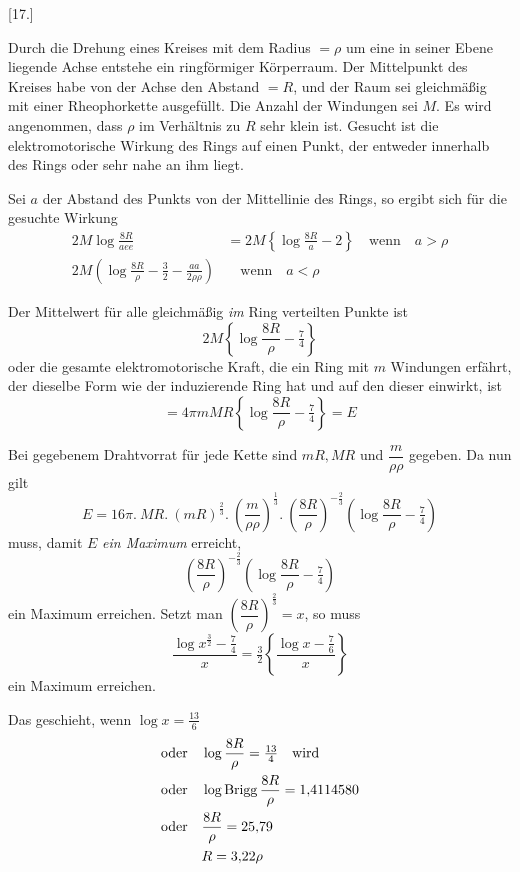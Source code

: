 \begin{center}[17.]\end{center}
Durch die Drehung eines Kreises mit dem Radius $=\rho$ um eine in seiner Ebene liegende Achse entstehe ein ringförmiger Körperraum. Der Mittelpunkt des Kreises habe von der Achse den Abstand $=R$, und der Raum sei gleichmäßig mit einer Rheophorkette ausgefüllt. Die Anzahl der Windungen sei $M$. Es wird angenommen, dass $\rho$ im Verhältnis zu $R$ sehr klein ist. Gesucht ist die elektromotorische Wirkung des Rings auf einen Punkt, der entweder innerhalb des Rings oder sehr nahe an ihm liegt.
\begin{center}\end{center}

Sei $a$ der Abstand des Punkts von der Mittellinie des Rings, so ergibt sich für die gesuchte Wirkung
\[
\begin{aligned}
2M\log\frac{8R}{aee}&=2M\left\{\log\frac{8R}{a}-2\right\}\quad\text{wenn}\quad a>\rho\\
2M\left(\log\frac{8R}{\rho}-\tfrac32-\frac{aa}{2\rho\rho}\right)&\quad\text{wenn}\quad a<\rho
\end{aligned}
\]

Der Mittelwert für alle gleichmäßig \textit{im} Ring verteilten Punkte ist
\[
2M\left\{\log\frac{8R}{\rho}-\tfrac74\right\}
\]
oder die gesamte elektromotorische Kraft, die ein Ring mit $m$ Windungen erfährt, der dieselbe Form wie der induzierende Ring hat und auf den dieser einwirkt, ist
\[
=4\pi mMR\left\{\log\frac{8R}{\rho}-\tfrac74\right\}=E
\]

Bei gegebenem Drahtvorrat für jede Kette sind $mR,MR$ und $\dfrac{m}{\rho\rho}$ gegeben. Da nun gilt
\[
E=16\pi.\ MR.\ (mR)^{\frac23}.\ \left(\frac{m}{\rho\rho}\right)^{\frac13}.\ \left(\frac{8R}{\rho}\right)^{-\frac23}\left(\log\frac{8R}{\rho}-\tfrac74\right)
\]
muss, damit $E$ \textit{ein Maximum} erreicht,
\[
\left(\frac{8R}{\rho}\right)^{-\frac23}\left(\log\frac{8R}{\rho}-\tfrac74\right)
\]
ein Maximum erreichen. Setzt man $\left(\dfrac{8R}{\rho}\right)^{\frac23}=x$, so muss
\[
\frac{\log x^{\frac32}-\tfrac74}{x}=\tfrac32\left\{\frac{\log x-\tfrac76}{x}\right\}
\]
ein Maximum erreichen.

Das geschieht, wenn $\log x=\tfrac{13}{6}$
\[
\begin{aligned}
&\text{oder}\quad\log\frac{8R}{\rho}=\tfrac{13}{4}\quad\text{wird}\\
&\text{oder}\quad\log\operatorname{Brigg}\frac{8R}{\rho}=1{,}4114580\\
&\text{oder}\quad\frac{8R}{\rho}=25{,}79\\
&\hphantom{\text{oder}\quad}R=3{,}22\rho
\end{aligned}
\]

